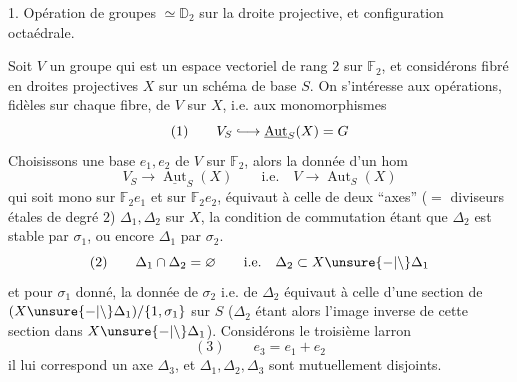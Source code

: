 1. Opération de groupes $\simeq\mathbb D_2$ sur la droite projective, et configuration octaédrale.

Soit $V$ un groupe qui est un espace vectoriel de rang $2$ sur $\mathbb F_2$, et considérons   fibré en droites projectives $X$ sur un schéma de base $S$. On s'intéresse aux opérations, fidèles sur chaque fibre, de $V$ sur $X$, i.e. aux monomorphismes
\[
(1)\qquad V_S\lhook\joinrel\longrightarrow\underline{\operatorname{Aut}}_S(X)=G
\]
Choisissons une base $e_1,e_2$ de $V$ sur $\mathbb F_2$, alors la donnée d'un hom
\[
V_S\longrightarrow\underline{\operatorname{Aut}}_S(X)\qquad\text{i.e.}\quad V\longrightarrow\operatorname{Aut}_S(X)
\]
qui soit mono sur $\mathbb F_2e_1$ et sur $\mathbb F_2e_2$, équivaut à celle de deux  ``axes'' ($=$ diviseurs étales de degré $2$) $\Delta_1,\Delta_2$ sur $X$, la condition de commutation étant que $\Delta_2$ est stable par $\sigma_1$, ou encore $\Delta_1$  par $\sigma_2$.
\[
(2)\qquad\Delta_1\cap\Delta_2=\varnothing\qquad\text{i.e.}\quad\Delta_2\subset X\unsure{-|\setminus}\Delta_1
\]
et pour $\sigma_1$  donné, la donnée de  $\sigma_2$ i.e. de $\Delta_2$ équivaut à celle d'une section de  $(X\unsure{-|\setminus}\Delta_1)/\{1,\sigma_1\}$ sur $S$ ($\Delta_2$ étant alors l'image inverse de cette section dans $X\unsure{-|\setminus}\Delta_1$). Considérons le troisième larron
\[
(3)\qquad e_3=e_1+e_2
\]
il lui correspond un axe $\Delta_3$, et $\Delta_1,\Delta_2,\Delta_3$ sont mutuellement disjoints.
